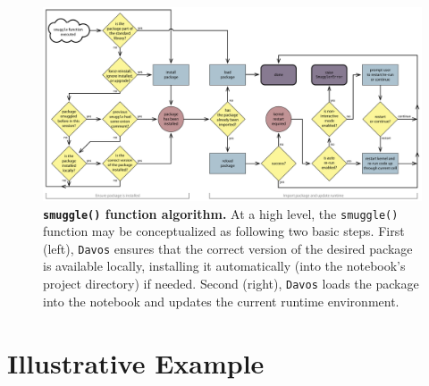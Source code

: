\documentclass[preprint,12pt,a4paper]{elsarticle}
\begin{document}
\begin{figure}[tp]
\centering
\includegraphics[width=\textwidth]{figs/flow_chart}
\caption{\small \textbf{\texttt{smuggle()} function algorithm.}  At a
  high level, the \texttt{smuggle()} function may be conceptualized as
  following two basic steps.  First (left), \texttt{Davos} ensures that the
  correct version of the desired package is available locally, installing
  it automatically (into the notebook's project directory) if needed.  Second (right),
  \texttt{Davos} loads the package into the notebook and updates the current
  runtime environment.}
\label{fig:flow-chart}
\end{figure}

\section{Illustrative Example}\label{sec:illustrative-example}
\end{document}
